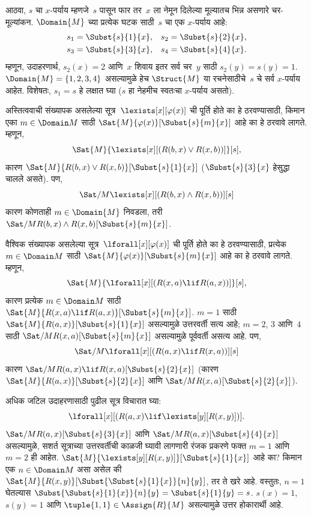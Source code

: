 \begin{ex}
आठवा, $s$ चा $x$-पर्याय म्हणजे~$s$ पासून फार तर~$x$ ला नेमून
दिलेल्या मूल्यातच भिन्न असणारे चर-मूल्यांकन. $\Domain{M}$ च्या प्रत्येक
घटक साठी~$s$ चा एक $x$-पर्याय आहे:
\begin{align*}
  s_1 & = \Subst{s}{1}{x}, &
  s_2 & = \Subst{s}{2}{x},\\
  s_3 & = \Subst{s}{3}{x}, &
  s_4 & = \Subst{s}{4}{x}.
\end{align*}
म्हणून, उदाहरणार्थ, $s_2(x) = 2$ आणि~$x$ शिवाय इतर सर्व चर~$y$ साठी
$s_2(y) = s(y) = 1$. $\Domain{M} = \{1, 2, 3, 4\}$ असल्यामुळे हेच
$\Struct{M}$ या रचनेसाठीचे~$s$ चे सर्व $x$-पर्याय आहेत. विशेषतः,
$s_1 = s$ हे लक्षात घ्या ($s$ हा नेहमीच स्वतःचा $x$-पर्याय असतो).

अस्तित्ववाची संख्यापक असलेल्या
  सूत्र~$\lexists[x][\varphi(x)]$ ची पूर्ति होते का हे ठरवण्यासाठी,
  किमान एका $m \in \Domain M$ साठी
  $\Sat{M}{\varphi(x)}[\Subst{s}{m}{x}]$ आहे का हे ठरवावे लागते. म्हणून,
  \[  \Sat{M}{\lexists[x][(R(b,x) \lor R(x,b))]}[s],
  \]
  कारण $\Sat{M}{R(b,x) \lor R(x, b)}[\Subst{s}{1}{x}]$
  ($\Subst{s}{3}{x}$ हेसुद्धा चालले असते). पण,
  \[  \Sat/{M}{\lexists[x][(R(b,x) \land R(x,b))]}[s]
  \]
  कारण कोणताही $m \in \Domain{M}$ निवडला, तरी
  $\Sat/{M}{R(b,x) \land R(x,b)}[\Subst{s}{m}{x}]$.

वैश्विक संख्यापक असलेल्या
  सूत्र~$\lforall[x][\varphi(x)]$ ची पूर्ति होते का हे ठरवण्यासाठी,
  प्रत्येक $m \in \Domain M$ साठी
  $\Sat{M}{\varphi(x)}[\Subst{s}{m}{x}]$ आहे का हे ठरवावे लागते. म्हणून,
  \[  \Sat{M}{\lforall[x][(R(x,a) \lif R(a,x))]}[s],
  \]
  कारण प्रत्येक $m \in \Domain M$ साठी
  $\Sat{M}{R(x,a) \lif R(a,x)}[\Subst{s}{m}{x}]$. $m = 1$ साठी
  $\Sat{M}{R(a,x)}[\Subst{s}{1}{x}]$ असल्यामुळे उत्तरवर्ती सत्य आहे;
  $m = 2$, $3$ आणि~$4$ साठी $\Sat/{M}{R(x,a)}[\Subst{s}{m}{x}]$
  असल्यामुळे पूर्ववर्ती असत्य आहे. पण,
  \[  \Sat/{M}{\lforall[x][(R(a,x) \lif R(x,a))]}[s]
  \]
  कारण $\Sat/{M}{R(a,x) \lif R(x,a)}[\Subst{s}{2}{x}]$ (कारण
  $\Sat{M}{R(a, x)}[\Subst{s}{2}{x}]$ आणि $\Sat/{M}{R(x,
  a)}[\Subst{s}{2}{x}]$).





अधिक जटिल उदाहरणासाठी पुढील सूत्र विचारात घ्या:
\[\lforall[x][(R(a,x) \lif \lexists[y][R(x,y)])].
\]
$\Sat/{M}{R(a,x)}[\Subst{s}{3}{x}]$ आणि
$\Sat/{M}{R(a,x)}[\Subst{s}{4}{x}]$ असल्यामुळे, सशर्त सूत्राच्या
उत्तरवर्तीची काळजी घ्यावी लागणारी रंजक प्रकरणे फक्त $m = 1$ आणि
$m = 2$ ही आहेत. $\Sat{M}{\lexists[y][R(x,y)]}[\Subst{s}{1}{x}]$ आहे
का? किमान एक $n \in \Domain M$ असा असेल की
$\Sat{M}{R(x,y)}[\Subst{\Subst{s}{1}{x}}{n}{y}]$, तर ते खरे आहे.
वस्तुतः, $n = 1$ घेतल्यास $\Subst{\Subst{s}{1}{x}}{n}{y} =
\Subst{s}{1}{y} = s$. $s(x) = 1$, $s(y) = 1$ आणि
$\tuple{1,1} \in \Assign{R}{M}$ असल्यामुळे उत्तर होकारार्थी आहे.



\end{ex}
